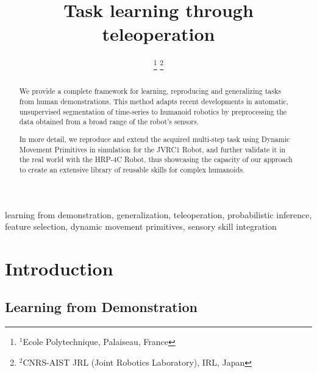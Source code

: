 \documentclass[conference]{IEEEtran}
\begin{document}
\title{\textbf{Task learning through teleoperation\\}
}

\author{
\IEEEauthorblockA{}
\and
{}
\IEEEauthorblockA{}
\thanks{$^{1}$Ecole Polytechnique, Palaiseau, France}
\thanks{$^{2}$CNRS-AIST JRL (Joint Robotics Laboratory), IRL, Japan}
}

\maketitle

\begin{abstract}
We provide a complete framework for learning, reproducing and generalizing tasks from human demonstrations. This method adapts recent developments in automatic, unsupervised segmentation of time-series to humanoid robotics by preprocessing the data obtained from a broad range of the robot's sensors.

In more detail,  we reproduce and extend the acquired multi-step task using Dynamic Movement Primitives in simulation for the JVRC1 Robot, and further validate it in the real world with the HRP-4C Robot, thus showcasing the capacity of our approach to create an extensive library of reusable skills for complex humanoids.
\end{abstract}

\begin{IEEEkeywords}
learning from demonstration, generalization, teleoperation, probabilistic inference, feature selection, dynamic movement primitives, sensory skill integration
\end{IEEEkeywords}

\section{Introduction}
\subsection{Learning from Demonstration}
\end{document}
